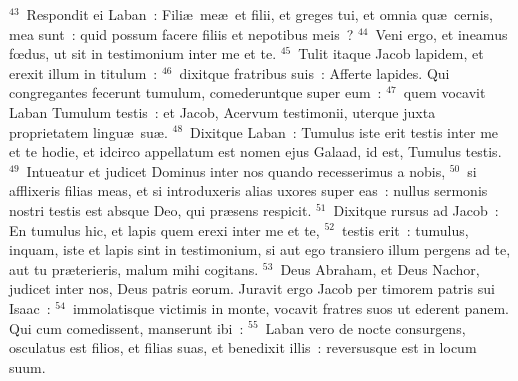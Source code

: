 ${}^{43}$~Respondit ei Laban~: Fili\ae\ me\ae\ et filii, et greges tui, et omnia qu\ae\ cernis, mea sunt~: quid possum facere filiis et nepotibus meis~?
${}^{44}$~Veni ergo, et ineamus fœdus, ut sit in testimonium inter me et te.
${}^{45}$~Tulit itaque Jacob lapidem, et erexit illum in titulum~:
${}^{46}$~dixitque fratribus suis~: Afferte lapides. Qui congregantes fecerunt tumulum, comederuntque super eum~:
${}^{47}$~quem vocavit Laban Tumulum testis~: et Jacob, Acervum testimonii, uterque juxta proprietatem lingu\ae\ su\ae .
${}^{48}$~Dixitque Laban~: Tumulus iste erit testis inter me et te hodie, et idcirco appellatum est nomen ejus Galaad, id est, Tumulus testis.
${}^{49}$~Intueatur et judicet Dominus inter nos quando recesserimus a nobis,
${}^{50}$~si afflixeris filias meas, et si introduxeris alias uxores super eas~: nullus sermonis nostri testis est absque Deo, qui pr\ae sens respicit.
${}^{51}$~Dixitque rursus ad Jacob~: En tumulus hic, et lapis quem erexi inter me et te,
${}^{52}$~testis erit~: tumulus, inquam, iste et lapis sint in testimonium, si aut ego transiero illum pergens ad te, aut tu pr\ae terieris, malum mihi cogitans.
${}^{53}$~Deus Abraham, et Deus Nachor, judicet inter nos, Deus patris eorum. Juravit ergo Jacob per timorem patris sui Isaac~:
${}^{54}$~immolatisque victimis in monte, vocavit fratres suos ut ederent panem. Qui cum comedissent, manserunt ibi~:
${}^{55}$~Laban vero de nocte consurgens, osculatus est filios, et filias suas, et benedixit illis~: reversusque est in locum suum.

